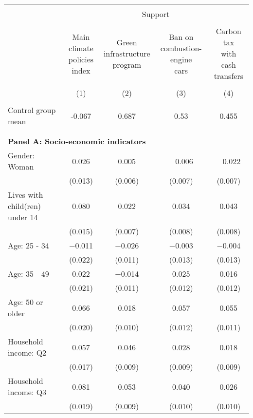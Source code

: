 
\begin{tabular}{@{\extracolsep{5pt}}lcccc} 
\\[-1.8ex]\hline 
\hline \\[-1.8ex] 
 & \multicolumn{4}{c}{Support} \\ 
\cline{2-5} 
\\[-1.8ex] & \makecell{Main climate\\policies index} & \makecell{Green\\infrastructure\\program} & \makecell{Ban on\\combustion-engine\\cars} & \makecell{Carbon tax\\with\\cash transfers} \\ 
\\[-1.8ex] & (1) & (2) & (3) & (4)\\ 
\hline \\[-1.8ex] 
Control group mean & -0.067 & 0.687 & 0.53 & 0.455  \\ \hline \\[-1.8ex]
\\[1ex]
\multicolumn{ 5 }{l}{\textbf{ Panel A: Socio-economic indicators }} \\
 Gender: Woman & 0.026 & 0.005 & $-$0.006 & $-$0.022 \\ 
  & (0.013) & (0.006) & (0.007) & (0.007) \\ 
  Lives with child(ren) under 14 & 0.080 & 0.022 & 0.034 & 0.043 \\ 
  & (0.015) & (0.007) & (0.008) & (0.008) \\ 
  Age: 25 - 34 & $-$0.011 & $-$0.026 & $-$0.003 & $-$0.004 \\ 
  & (0.022) & (0.011) & (0.013) & (0.013) \\ 
  Age: 35 - 49 & 0.022 & $-$0.014 & 0.025 & 0.016 \\ 
  & (0.021) & (0.011) & (0.012) & (0.012) \\ 
  Age: 50 or older & 0.066 & 0.018 & 0.057 & 0.055 \\ 
  & (0.020) & (0.010) & (0.012) & (0.011) \\ 
  Household income: Q2 & 0.057 & 0.046 & 0.028 & 0.018 \\ 
  & (0.017) & (0.009) & (0.009) & (0.009) \\ 
  Household income: Q3 & 0.081 & 0.053 & 0.040 & 0.026 \\ 
  & (0.019) & (0.009) & (0.010) & (0.010) \\ 

\end{tabular}
